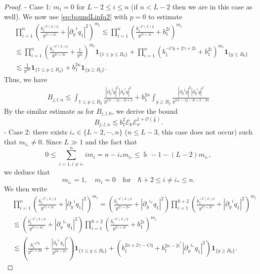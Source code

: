 \documentclass[11pt]{aims}
\theoremstyle{definition}
\numberwithin{equation}{section}
\begin{document}
\begin{proof}
- Case 1: $m_i = 0$ for $L - 2 \leq i \leq n$ (if $n < L-2$ then we are in this case as well). We now use \eqref{eq:boundLinfq2} with $p = 0$ to estimate 
\begin{align*}
&\prod_{i = 1}^n \left(\frac{b_1^{-C(L)\eta}}{y^{2\gamma + 2i}} +  |{\partial_y}^iq_1|^2\right)^{m_i} \lesssim \prod_{i = 1}^n \left(\frac{b_1^{-C(L)\eta}}{y^{2\gamma + 2i}} +  b_1^{2i}\right)^{m_i}\\
& \lesssim \prod_{i = 1}^n\left(\frac{b_1^{-C(L)\eta}}{y^{2\gamma + 2i}} +  \frac{1}{y^{2i}}\right)^{m_i}\mathbf{1}_{\{1 \leq y \leq B_0\}} + \prod_{i = 1}^n \left(b_1^{-C\eta + 2\gamma + 2i} + b_1^{2i} \right)^{m_i}\mathbf{1}_{\{y \geq B_0\}}\\
& \lesssim \frac{1}{y^{2n}}\mathbf{1}_{\{1 \leq y \leq B_0\}} + b_1^{2n }\mathbf{1}_{\{y \geq B_0\}}.
\end{align*}
Thus, we have 
\begin{align*}
B_{j,l,n} \lesssim \int_{1 \leq y \leq B_0} \frac{|{\partial_y}^j q|^2 |{\partial_y}^l q|^2}{y^{2\Bbbk - 2j - 2l + 2 }} +  b_1^{2n}\int_{y \geq B_0} \frac{|{\partial_y}^j q|^2 |{\partial_y}^l q|^2}{y^{2\Bbbk - 2j - 2l + 2 - 2n}}
\end{align*}
By the similar estimate as for $B_{i,l,0}$, we derive the bound
$$B_{j,l,n} \lesssim b_1^2{\mathscr{E}}_\Bbbk{\mathscr{E}}_\sigma^{1 + {\mathcal{O}}\left(\frac{1}{L} \right)}.$$
- Case 2: there exists $i_* \in \{L - 2,\cdots,  n\}$ ($n \leq L - 3$, this case does not occur) such that $m_{i_*} \ne 0$. Since $L \gg 1$ and the fact that $$0\leq \sum_{i = 1, i \ne i_*}^n i m_i = n - i_*m_{i_*} \leq \Bbbk - 1 - (L-2)m_{i_*},$$
we deduce that
$$m_{i_*} = 1, \quad m_{i} = 0 \quad \text{for}\quad \hbar + 2 \leq i \ne i_* \leq n.$$
We then write 
\begin{align*}
&\prod_{i = 1}^n \left(\frac{b_1^{-C(L)\eta}}{y^{2\gamma + 2i}} +  |{\partial_y}^iq_1|^2\right)^{m_i} = \left(\frac{b_1^{-C(L)\eta}}{y^{2\gamma + 2i_*}} +  |{\partial_y}^{i_*}q_1|^2\right)\prod_{i = 1}^{\hbar + 2} \left(\frac{b_1^{-C(L)\eta}}{y^{2\gamma + 2i}} +  |{\partial_y}^iq_1|^2\right)^{m_i} \\
&\lesssim \left(\frac{b_1^{-C(L)\eta}}{y^{2\gamma + 2i_*}} +  |{\partial_y}^{i_*}q_1|^2\right)\prod_{i = 1}^{\hbar + 2} \left(\frac{b_1^{-C(L)\eta}}{y^{2\gamma + 2i}} +  b_1^{2i}\right)^{m_i}\\
&\lesssim \left(\frac{b_1^{-C\eta}}{y^{2\gamma + 2n}} + \frac{|{\partial_y}^{i_*} q_1|^2}{y^{2n - 2i_* }}\right)\mathbf{1}_{\{1 \leq y \leq B_0\}} + \left(b_1^{2n + 2\gamma - C\eta} +  b_1^{2n - 2i^* } |{\partial_y}^{i_*}q_1|^2  \right) \mathbf{1}_{\{y \geq B_0\}}.

\end{align*}
\end{proof}
\end{document}
